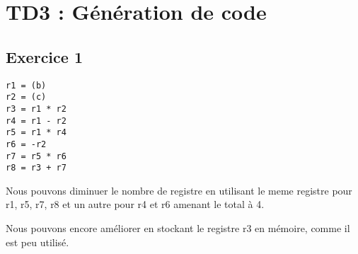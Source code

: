 \chapter{TD3 : Génération de code}

\section{Exercice 1}
\begin{lstlisting}
r1 = (b)
r2 = (c)
r3 = r1 * r2
r4 = r1 - r2
r5 = r1 * r4
r6 = -r2
r7 = r5 * r6
r8 = r3 + r7
\end{lstlisting}

Nous pouvons diminuer le nombre de registre en utilisant le meme registre pour
r1, r5, r7, r8 et un autre pour r4 et r6 amenant le total à 4.

Nous pouvons encore améliorer en stockant le registre r3 en mémoire, comme il
est peu utilisé.

